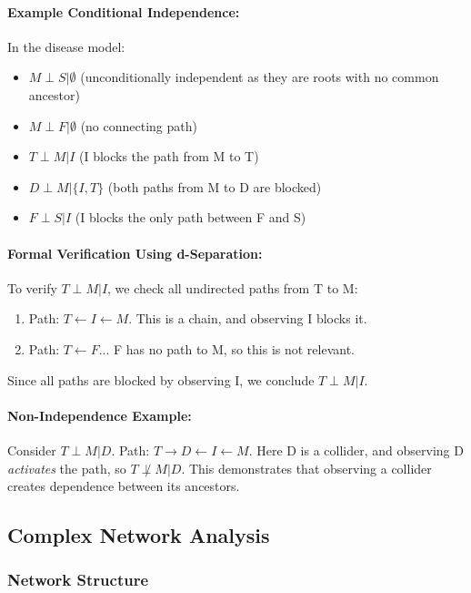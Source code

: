 \documentclass[conference]{IEEEtran}
\begin{document}
\paragraph{Example Conditional Independence:}
In the disease model:
\begin{itemize}
    \item $M \perp S | \emptyset$ (unconditionally independent as they are roots with no common ancestor)
    \item $M \perp F | \emptyset$ (no connecting path)
    \item $T \perp M | I$ (I blocks the path from M to T)
    \item $D \perp M | \{I, T\}$ (both paths from M to D are blocked)
    \item $F \perp S | I$ (I blocks the only path between F and S)
\end{itemize}

\paragraph{Formal Verification Using d-Separation:}
To verify $T \perp M | I$, we check all undirected paths from T to M:
\begin{enumerate}
    \item Path: $T \leftarrow I \leftarrow M$. This is a chain, and observing I blocks it.
    \item Path: $T \leftarrow F$... F has no path to M, so this is not relevant.
\end{enumerate}

Since all paths are blocked by observing I, we conclude $T \perp M | I$.

\paragraph{Non-Independence Example:}
Consider $T \perp M | D$. Path: $T \rightarrow D \leftarrow I \leftarrow M$. Here D is a collider, and observing D \textit{activates} the path, so $T \not\perp M | D$. This demonstrates that observing a collider creates dependence between its ancestors.

\subsection{Complex Network Analysis}

\subsubsection{Network Structure}
\end{document}
